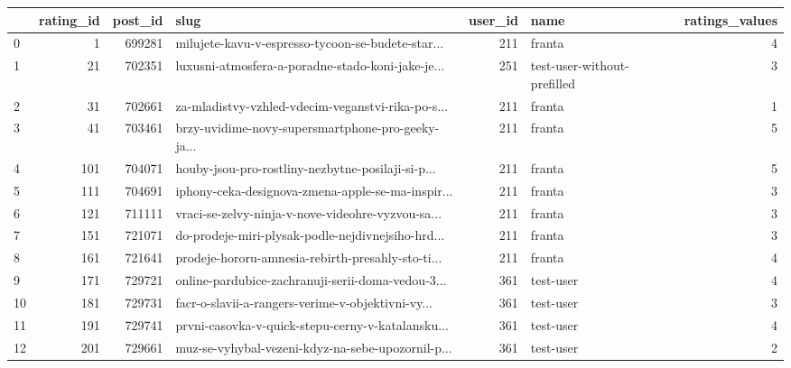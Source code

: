 \begin{tabular}{lrrlrlr}
\toprule
{} &  rating\_id &  post\_id &                                               slug &  user\_id &                         name &  ratings\_values \\
\midrule
0    &          1 &   699281 &  milujete-kavu-v-espresso-tycoon-se-budete-star... &      211 &                       franta &               4 \\
1    &         21 &   702351 &  luxusni-atmosfera-a-poradne-stado-koni-jake-je... &      251 &  test-user-without-prefilled &               3 \\
2    &         31 &   702661 &  za-mladistvy-vzhled-vdecim-veganstvi-rika-po-s... &      211 &                       franta &               1 \\
3    &         41 &   703461 &  brzy-uvidime-novy-supersmartphone-pro-geeky-ja... &      211 &                       franta &               5 \\
4    &        101 &   704071 &  houby-jsou-pro-rostliny-nezbytne-posilaji-si-p... &      211 &                       franta &               5 \\
5    &        111 &   704691 &  iphony-ceka-designova-zmena-apple-se-ma-inspir... &      211 &                       franta &               3 \\
6    &        121 &   711111 &  vraci-se-zelvy-ninja-v-nove-videohre-vyzvou-sa... &      211 &                       franta &               3 \\
7    &        151 &   721071 &  do-prodeje-miri-plysak-podle-nejdivnejsiho-hrd... &      211 &                       franta &               3 \\
8    &        161 &   721641 &  prodeje-hororu-amnesia-rebirth-presahly-sto-ti... &      211 &                       franta &               4 \\
9    &        171 &   729721 &  online-pardubice-zachranuji-serii-doma-vedou-3... &      361 &                    test-user &               4 \\
10   &        181 &   729731 &  facr-o-slavii-a-rangers-verime-v-objektivni-vy... &      361 &                    test-user &               3 \\
11   &        191 &   729741 &  prvni-casovka-v-quick-stepu-cerny-v-katalansku... &      361 &                    test-user &               4 \\
12   &        201 &   729661 &  muz-se-vyhybal-vezeni-kdyz-na-sebe-upozornil-p... &      361 &                    test-user &               2 \\

\end{tabular}
